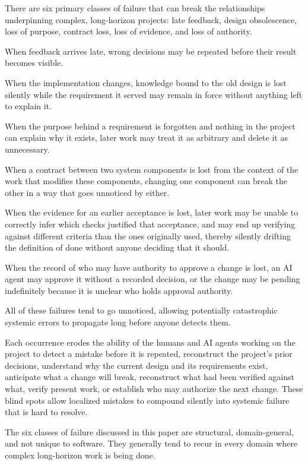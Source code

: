 There are six primary classes of failure that can break the relationships underpinning complex, long-horizon projects: late feedback, design obsolescence, loss of purpose, contract loss, loss of evidence, and loss of authority.

When feedback arrives late, wrong decisions may be repeated before their result becomes visible.

When the implementation changes, knowledge bound to the old design is lost silently while the requirement it served may remain in force without anything left to explain it.

When the purpose behind a requirement is forgotten and nothing in the project can explain why it exists, later work may treat it as arbitrary and delete it as unnecessary.

When a contract between two system components is lost from the context of the work that modifies these components, changing one component can break the other in a way that goes unnoticed by either.

When the evidence for an earlier acceptance is lost, later work may be unable to correctly infer which checks justified that acceptance, and may end up verifying against different criteria than the ones originally used, thereby silently drifting the definition of done without anyone deciding that it should.

When the record of who may have authority to approve a change is lost, an AI agent may approve it without a recorded decision, or the change may be pending indefinitely because it is unclear who holds approval authority.

All of these failures tend to go unnoticed, allowing potentially catastrophic systemic errors to propagate long before anyone detects them.

Each occurrence erodes the ability of the humans and AI agents working on the project to detect a mistake before it is repeated, reconstruct the project's prior decisions, understand why the current design and its requirements exist, anticipate what a change will break, reconstruct what had been verified against what, verify present work, or establish who may authorize the next change. These blind spots allow localized mistakes to compound silently into systemic failure that is hard to resolve.

The six classes of failure discussed in this paper are structural, domain-general, and not unique to software. They generally tend to recur in every domain where complex long-horizon work is being done.

